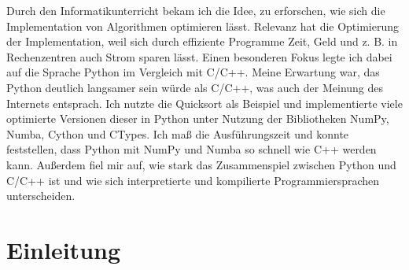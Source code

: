 \documentclass[11pt,a4paper]{article}
\begin{document}
Durch den Informatikunterricht bekam ich die Idee, zu erforschen, wie sich
die Implementation von Algorithmen optimieren lässt.
Relevanz hat die Optimierung der Implementation, weil sich durch effiziente Programme Zeit, Geld
und z. B. in Rechenzentren auch Strom sparen lässt.
Einen besonderen Fokus legte ich dabei auf die Sprache Python im Vergleich mit C/C++.
Meine Erwartung war, das Python deutlich langsamer sein würde als C/C++,
was auch der Meinung des Internets entsprach.
Ich nutzte die Quicksort als Beispiel und implementierte viele optimierte Versionen dieser
in Python unter Nutzung der Bibliotheken NumPy, Numba, Cython und CTypes.
Ich maß die Ausführungszeit und konnte feststellen, dass Python mit NumPy und Numba
so schnell wie C++ werden kann.
Außerdem fiel mir auf, wie stark das Zusammenspiel zwischen Python und C/C++ ist
und wie sich interpretierte und kompilierte Programmiersprachen unterscheiden.

\clearpage

\renewcommand*\contentsname{Inhaltsverzeichnis}

\tableofcontents

\clearpage

\section{Einleitung}
\end{document}
